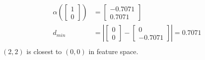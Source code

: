 \documentclass[fleqn]{article}
\begin{document}
\begin{description}
\begin{align*}
        \alpha \left ( \begin{bmatrix}1 \\ 0\end{bmatrix} \right ) &= \begin{bmatrix} -0.7071 \\ 0.7071 \end{bmatrix} \\
        d_{min} &= \left | \begin{bmatrix}0 \\ 0\end{bmatrix} - \begin{bmatrix}0 \\ -0.7071\end{bmatrix} \right | = 0.7071 \\
    \end{align*}
    \begin{math}(2,2)\end{math} is closest to \begin{math}(0,0)\end{math} in feature space.

\end{description}
\end{document}
